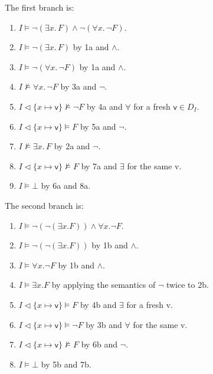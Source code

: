 \begin{exer}[2.3]
\begin{enumerate}[label=(\alph*)]
            The first branch is:
            \begin{enumerate}[label=\arabic*a.]
                \item %
                    $I \models \neg(\exists x.\, F) \land \neg(\forall x.\, \neg F)$.
                \item %
                    $I \models \neg(\exists x.\, F)$ by 1a and $\land$.
                \item %
                    $I \models \neg(\forall x.\, \neg F)$ by 1a and $\land$.
                \item %
                    $I \not\models \forall x.\, \neg F$ by 3a and $\neg$.
                \item %
                    $I \vartriangleleft \{ x \mapsto \textsf{v} \} \not\models \neg F$ by 4a and $\forall$ for a fresh $\textsf{v} \in D_I$.
                \item %
                    $I \vartriangleleft \{ x \mapsto \textsf{v} \} \models F$ by 5a and $\neg$.
                \item %
                    $I \not\models \exists x.\, F$ by 2a and $\neg$.
                \item %
                    $I \vartriangleleft \{ x \mapsto \textsf{v} \} \not\models F$ by 7a and $\exists$ for the same \textsf{v}.
                \item %
                    $I \models \bot$ by 6a and 8a.
            \end{enumerate}

            The second branch is:
            \begin{enumerate}[label=\arabic*b.]
                \item %
                    $I \models \neg(\neg(\exists x. F)) \land \forall x. \neg F$.
                \item %
                    $I \models \neg(\neg(\exists x. F))$ by 1b and $\land$.
                \item %
                    $I \models \forall x. \neg F$ by 1b and $\land$.
                \item %
                    $I \models \exists x. F$ by applying the semantics of $\neg$ twice to 2b.
                \item %
                    $I \vartriangleleft \{ x \mapsto \textsf{v} \} \models F$ by 4b and $\exists$ for a fresh \textsf{v}.
                \item %
                    $I \vartriangleleft \{ x \mapsto \textsf{v} \} \models \neg F$ by 3b and $\forall$ for the same \textsf{v}.
                \item %
                    $I \vartriangleleft \{ x \mapsto \textsf{v} \} \not\models F$ by 6b and $\neg$.
                \item %
                    $I \models \bot$ by 5b and 7b.
            \end{enumerate}

    \end{enumerate}
\end{exer}

